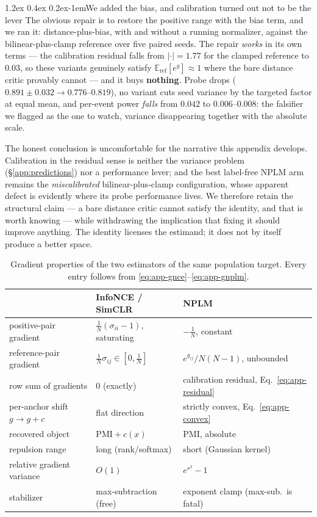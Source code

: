 \documentclass{article}
\makeatletter
\renewcommand\paragraph{\@startsection{paragraph}{4}{\z@}%
  {1.2ex \@plus 0.4ex \@minus 0.2ex}{-1em}{\normalsize\bf}}
\newcommand{\E}{\mathbb{E}}
\makeatother
\begin{document}
\paragraph{We added the bias, and calibration turned out not to be the lever}
The obvious repair is to restore the positive range with the bias term, and we
ran it: distance-plus-bias, with and without a running normalizer, against the
bilinear-plus-clamp reference over five paired seeds. The repair \emph{works} in
its own terms --- the calibration residual falls from $|{\cdot}|=1.77$ for the
clamped reference to $0.03$, so these variants genuinely satisfy
$\E_{\mathrm{ref}}[e^{g}]\approx1$ where the bare distance critic provably
cannot --- and it buys \textbf{nothing}. Probe drops
($0.891\pm0.032 \to 0.776$--$0.819$), no variant cuts seed variance by the
targeted factor at equal mean, and per-event power \emph{falls} from $0.042$ to
$0.006$--$0.008$: the falsifier we flagged as the one to watch, variance
disappearing together with the absolute scale.

The honest conclusion is uncomfortable for the narrative this appendix
develops. Calibration in the residual sense is neither the variance problem
(\S\ref{app:predictions}) nor a performance lever; and the best label-free NPLM
arm remains the \emph{miscalibrated} bilinear-plus-clamp configuration, whose
apparent defect is evidently where its probe performance lives. We therefore
retain the structural claim --- a bare distance critic cannot satisfy the
identity, and that is worth knowing --- while withdrawing the implication that
fixing it should improve anything. The identity licenses the estimand; it does
not by itself produce a better space.

\begin{table}[t]\centering\small
\begin{tabular}{lll}
\toprule
& InfoNCE / SimCLR & NPLM \\
\midrule
positive-pair gradient & $\tfrac1N(\sigma_{ii}-1)$, saturating & $-\tfrac1N$, constant \\
reference-pair gradient & $\tfrac1N\sigma_{ij}\in[0,\tfrac1N]$ & $e^{g_{ij}}/N(N-1)$, unbounded \\
row sum of gradients & $0$ (exactly) & calibration residual, Eq.~\eqref{eq:app-residual} \\
per-anchor shift $g\to g+c$ & flat direction & strictly convex, Eq.~\eqref{eq:app-convex} \\
recovered object & $\mathrm{PMI}+c(x)$ & $\mathrm{PMI}$, absolute \\
repulsion range & long (rank/softmax) & short (Gaussian kernel) \\
relative gradient variance & $O(1)$ & $e^{s^2}-1$ \\
stabilizer & max-subtraction (free) & exponent clamp (max-sub.\ is fatal) \\
\bottomrule
\end{tabular}
\caption{Gradient properties of the two estimators of the same population
target. Every entry follows from \eqref{eq:app-gnce}--\eqref{eq:app-gnplm}.}
\label{tab:app-grad}
\end{table}
\end{document}
